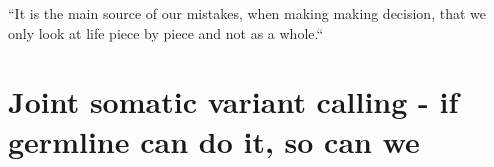 
\begin{savequote}[85mm]
``It is the main source of our mistakes,  when making making decision, that we only look at life piece by piece and not as a whole.``
\end{savequote}

\chapter[Joint somatic variant calling]{Joint somatic variant calling - if germline can do it, so can we}
\label{ch:variantcalling}









